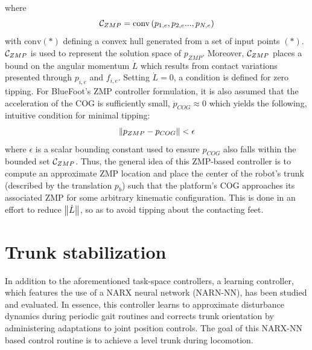 		where
			\begin{equation}
				{\cal C}_{ZMP} = \text{conv}\left(p_{1,e},p_{2,e}...,p_{N,e}\right)
			\end{equation}
		with $\text{conv}(*)$ defining a convex hull generated from a set of input points $(*)$. ${\cal C}_{ZMP}$ is used to represent the solution space of $p_{ZMP}$. Moreover, ${\cal C}_{ZMP}$ places a bound on the angular momentum $\dot{L}$ which results from contact variations presented through $p_{i,e}$ and $f_{i,e}$. Setting $\dot{L}=0$, a condition is defined for zero tipping. For BlueFoot's ZMP controller formulation, it is also assumed that the acceleration of the COG is sufficiently small, \IE $\ddot{p}_{COG}\approx0$ which yields the following, intuitive condition for minimal tipping:
			\begin{equation}
				\left\lVert p_{ZMP} - p_{COG}\right\rVert < \epsilon
			\end{equation}
		where $\epsilon$ is a scalar bounding constant used to ensure $p_{COG}$ also falls within the bounded set ${\cal C}_{ZMP}$. Thus, the general idea of this ZMP-based controller is to compute an approximate ZMP location and place the center of the robot's trunk (described by the translation $p_{b}$) such that the platform's COG approaches its associated ZMP for some arbitrary kinematic configuration. This is done in an effort to reduce $\left\lVert\dot{L}\right\rVert$, so as to avoid tipping about the contacting feet.







	\section{Trunk stabilization}

		In addition to the aforementioned task-space controllers, a learning controller, which features the use of a NARX neural network (NARN-NN), has been studied and evaluated. In essence, this controller learns to approximate disturbance dynamics during periodic gait routines and corrects trunk orientation by administering adaptations to joint position controls. The goal of this NARX-NN based control routine is to achieve a level trunk during locomotion.
		

